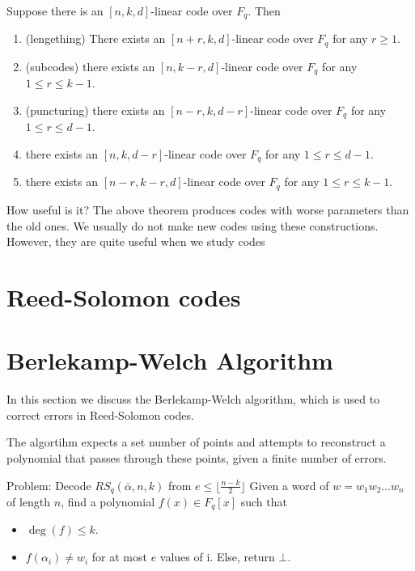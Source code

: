 \begin{theorem}
    Suppose there is an $[n, k, d]$-linear code over $F_q$. Then
    \begin{enumerate}
        \item (lengething) There exists an $[n + r, k, d]$-linear code over 
        $F_q$ for any $r \ge 1$.

        \item (subcodes) there exists an $[n, k-r, d]$-linear code over $F_q$ for any 
        $1 \le r \le k- 1$.

        \item (puncturing) there exists an $[n- r, k, d- r]$-linear code over $F_q$ for any
        $1 \le r \le d- 1$.

        \item there exists an $[n, k, d- r]$-linear code over
         $F_q$ for any $1 \le r \le d- 1$.
        
        \item there exists an $[n- r, k- r, d]$-linear code over
         $F_q$ for any $1 \le r \le k- 1$.
    \end{enumerate}
\end{theorem}

\begin{bclogo}[couleur=blue!10, arrondi=0.1, logo=\bcinfo]{How useful is it?}
The above theorem produces codes with worse
parameters than the old ones. We usually do not make new codes using these
constructions. However, they are quite useful when we study codes
\end{bclogo}


\section{Reed-Solomon codes}


\section{Berlekamp-Welch Algorithm}
In this section we discuss the Berlekamp-Welch algorithm, 
which is used to correct errors in Reed-Solomon codes.

The algortihm expects a set number of points and attempts to reconstruct 
a polynomial that passes through these points, given a finite number of errors.

\begin{bclogo}[logo=\bcattention,noborder=true]{Problem: Decode 
    $RS_q(\bar{\alpha},n,k)$ from $e\le \lfloor\frac{n-k}{2}\rfloor$}
Given a word of $w=w_1w_2\dots w_n$ of length $n$, 
find a polynomial $f(x)\in F_q[x]$ such that
\begin{itemize}
    \item $\deg(f)\le k$.
    \item $f(\alpha_i)\ne w_i$ for at most $e$ values of i. Else, return $\bot$.
\end{itemize}

\end{bclogo}

